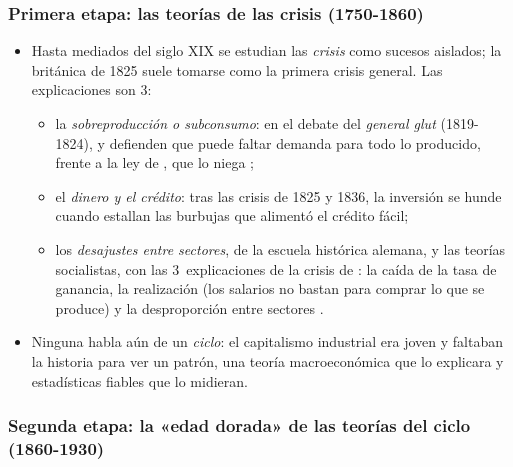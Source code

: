 \documentclass[11pt]{article}
\begin{document}
\subsubsection{Primera etapa: las teorías de las crisis (1750-1860)}\label{sec:crisis}

\begin{itemize}
\item Hasta mediados del siglo XIX se estudian las \emph{crisis} como sucesos aislados; la británica de 1825 suele tomarse como la primera crisis general. Las explicaciones son 3:
  \begin{itemize}
  \item la \emph{sobreproducción o subconsumo}: en el debate del \emph{general glut} (1819-1824), \textcite{Sismondi1819Nouveaux} y \textcite{Malthus1820Principles} defienden que puede faltar demanda para todo lo producido, frente a la ley de , que lo niega\nocite{Say1820Lettres} ;
  \item el \emph{dinero y el crédito}: tras las crisis de 1825 y 1836, la inversión se hunde cuando estallan las burbujas que alimentó el crédito fácil;
  \item los \emph{desajustes entre sectores}, de la escuela histórica alemana, y las teorías socialistas, con las 3~explicaciones de la crisis de : la caída de la tasa de ganancia, la realización (los salarios no bastan para comprar lo que se produce) y la desproporción entre sectores .
  \end{itemize}
\item Ninguna habla aún de un \emph{ciclo}: el capitalismo industrial era joven y faltaban la historia para ver un patrón, una teoría macroeconómica que lo explicara y estadísticas fiables que lo midieran.
\end{itemize}

\subsubsection{Segunda etapa: la «edad dorada» de las teorías del ciclo (1860-1930)}\label{sec:edad-dorada}
\end{document}
